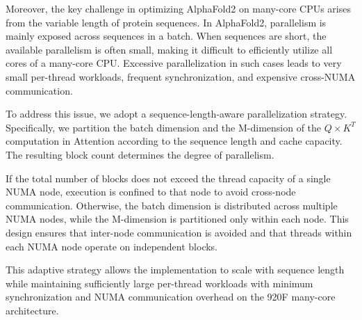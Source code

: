 

Moreover, the key challenge in optimizing AlphaFold2 on many-core CPUs arises from the variable length of protein sequences. In AlphaFold2, parallelism is mainly exposed across sequences in a batch. When sequences are short, the available parallelism is often small, making it difficult to efficiently utilize all cores of a many-core CPU. Excessive parallelization in such cases leads to very small per-thread workloads, frequent synchronization, and expensive cross-NUMA communication.

To address this issue, we adopt a sequence-length-aware parallelization strategy. Specifically, we partition the batch dimension and the
M-dimension of the $Q\times K^T$ computation in Attention according to the sequence length and cache capacity. The resulting block count determines the degree of parallelism.

If the total number of blocks does not exceed the thread capacity of a single NUMA node, execution is confined to that node to avoid cross-node communication. Otherwise, the batch dimension is distributed across multiple NUMA nodes, while the M-dimension is partitioned only within each node. This design ensures that inter-node communication is avoided and that threads within each NUMA node operate on independent blocks.

This adaptive strategy allows the implementation to scale with sequence length while maintaining sufficiently large per-thread workloads with minimum synchronization and NUMA communication overhead on the 920F many-core architecture.